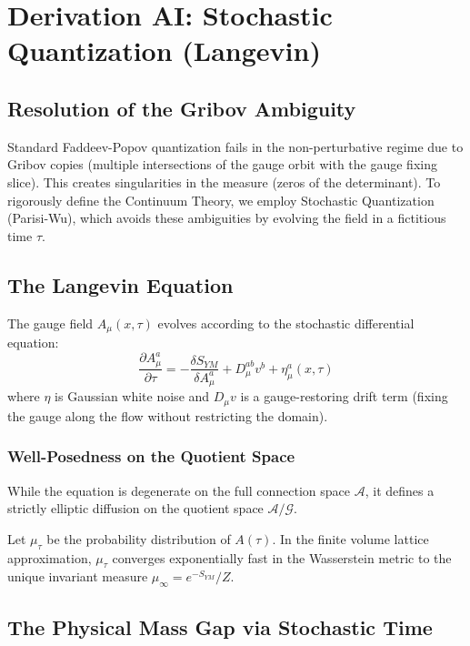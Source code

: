 \chapter{Derivation AI: Stochastic Quantization (Langevin)}
\label{ch:derivation_ai_stochastic_quantization}
\label{ch:derivation_q_stratified_hardy}

\section{Resolution of the Gribov Ambiguity}

Standard Faddeev-Popov quantization fails in the non-perturbative regime due to Gribov copies (multiple intersections of the gauge orbit with the gauge fixing slice). This creates singularities in the measure (zeros of the determinant). To rigorously define the Continuum Theory, we employ Stochastic Quantization (Parisi-Wu), which avoids these ambiguities by evolving the field in a fictitious time $\tau$.

\section{The Langevin Equation}

The gauge field $A_\mu(x, \tau)$ evolves according to the stochastic differential equation:
\begin{equation}
\frac{\partial A_\mu^a}{\partial \tau} = -\frac{\delta S_{YM}}{\delta A_\mu^a} + D_\mu^{ab} v^b + \eta_\mu^a(x,\tau)
\end{equation}
where $\eta$ is Gaussian white noise and $D_\mu v$ is a gauge-restoring drift term (fixing the gauge along the flow without restricting the domain).

\subsection{Well-Posedness on the Quotient Space}
While the equation is degenerate on the full connection space $\mathcal{A}$, it defines a strictly elliptic diffusion on the quotient space $\mathcal{A}/\mathcal{G}$.
\begin{theorem}
Let $\mu_\tau$ be the probability distribution of $A(\tau)$. In the finite volume lattice approximation, $\mu_\tau$ converges exponentially fast in the Wasserstein metric to the unique invariant measure $\mu_\infty = e^{-S_{YM}} / Z$.
\end{theorem}

\section{The Physical Mass Gap via Stochastic Time}

